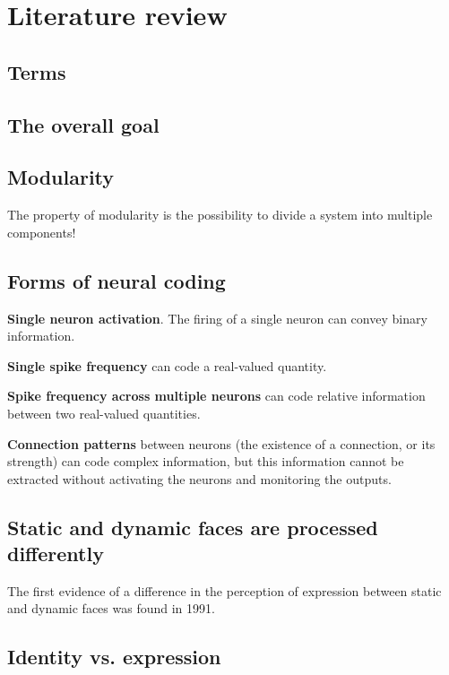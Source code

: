 \chapter{Literature review}

\section{Terms}

\section{The overall goal}


\section{Modularity}

The property of modularity is the possibility to divide a system into multiple components!

\section{Forms of neural coding}

\begin{itemise}
\item \textbf{Single neuron activation}. The firing of a single neuron can convey binary information.
\item \textbf{Single spike frequency} can code a real-valued quantity.
\item \textbf{Spike frequency across multiple neurons} can code relative information between two real-valued quantities.
\item \textbf{Connection patterns} between neurons (the existence of a connection, or its strength) can code complex information, but this information cannot be extracted without activating the neurons and monitoring the outputs.
\end{itemise}

\section{Static and dynamic faces are processed differently}

The first evidence of a difference in the perception of expression between static and dynamic faces was found in 1991\cite{humphreys1993expression}.


\section{Identity vs. expression}

